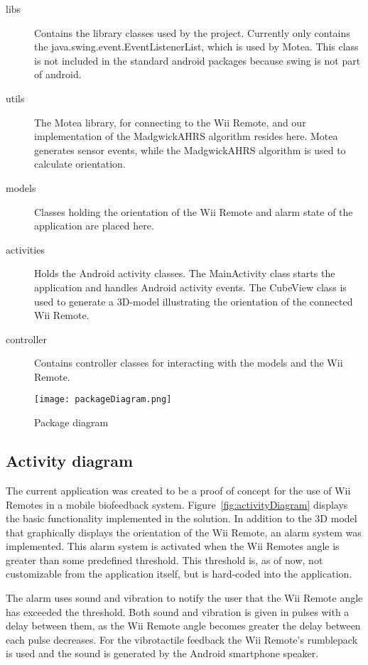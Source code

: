 \begin{description}
	\item[libs] Contains the library classes used by the project. Currently only contains the java.swing.event.EventListenerList, which is used by Motea. This class is not included in the standard android packages because swing is not part of android.
	\item[utils] The Motea library, for connecting to the Wii Remote, and our implementation of the MadgwickAHRS algorithm resides here. Motea generates sensor events, while the MadgwickAHRS algorithm is used to calculate orientation.
	\item[models] Classes holding the orientation of the Wii Remote and alarm state of the application are placed here.
	\item[activities] Holds the Android activity classes. The MainActivity class starts the application and handles Android activity events. The CubeView class is used to generate a 3D-model illustrating the orientation of the connected Wii Remote.
	\item[controller] Contains controller classes for interacting with the models and the Wii Remote.
\end{description}

\begin{figure}[h!]
  \centering
    \texttt{[image: packageDiagram.png]}
    \caption{\footnotesize Package diagram}
    \label{fig:packageDiagram}
\end{figure}

\subsection{Activity diagram}
The current application was created to be a proof of concept for the use of Wii Remotes in a mobile biofeedback system. Figure~\ref{fig:activityDiagram} displays the basic functionality implemented in the solution. In addition to the 3D model that graphically displays the orientation of the Wii Remote, an alarm system was implemented. This alarm system is activated when the Wii Remotes angle is greater than some predefined threshold. This threshold  is, as of now, not customizable from the application itself, but is hard-coded  into the application.

The alarm uses sound and vibration to notify the user that the Wii Remote angle has exceeded the threshold. Both sound and vibration is given in pulses with a delay between them, as the Wii Remote angle becomes greater the delay between each pulse decreases. For the vibrotactile feedback the Wii Remote's rumblepack is used and the sound is generated by the Android smartphone speaker. 

